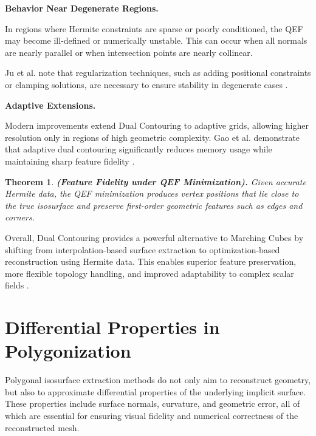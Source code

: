 \documentclass[12pt, a4paper, oneside]{book}
\theoremstyle{plain}
\newtheorem{theorem}{Theorem}[chapter]
\theoremstyle{definition}
\theoremstyle{remark}
\theoremstyle{definition}
\begin{document}
\vspace{0.5em}

\textbf{Behavior Near Degenerate Regions.}

In regions where Hermite constraints are sparse or poorly conditioned, the QEF may become ill-defined or numerically unstable. This can occur when all normals are nearly parallel or when intersection points are nearly collinear.

Ju et al. note that regularization techniques, such as adding positional constraints or clamping solutions, are necessary to ensure stability in degenerate cases \cite{ju2002dual}.

\vspace{0.5em}

\textbf{Adaptive Extensions.}

Modern improvements extend Dual Contouring to adaptive grids, allowing higher resolution only in regions of high geometric complexity. Gao et al. demonstrate that adaptive dual contouring significantly reduces memory usage while maintaining sharp feature fidelity \cite{gao2010adaptive}.

\vspace{0.5em}
\begin{theorem}
    \textbf{ (Feature Fidelity under QEF Minimization).}
Given accurate Hermite data, the QEF minimization produces vertex positions that lie close to the true isosurface and preserve first-order geometric features such as edges and corners.

\end{theorem}

\vspace{0.5em}

Overall, Dual Contouring provides a powerful alternative to Marching Cubes by shifting from interpolation-based surface extraction to optimization-based reconstruction using Hermite data. This enables superior feature preservation, more flexible topology handling, and improved adaptability to complex scalar fields \cite{ju2002dual,kobbelt2001feature,schaefer2005qef,gao2010adaptive}.


\section{Differential Properties in Polygonization}

Polygonal isosurface extraction methods do not only aim to reconstruct geometry, but also to approximate differential properties of the underlying implicit surface. These properties include surface normals, curvature, and geometric error, all of which are essential for ensuring visual fidelity and numerical correctness of the reconstructed mesh.
\end{document}
